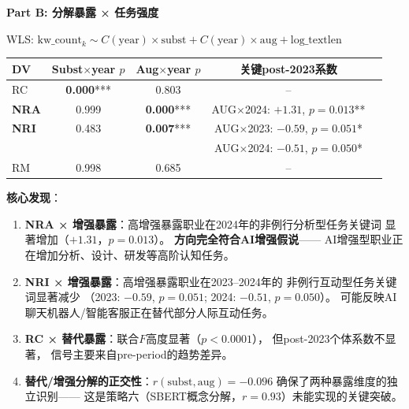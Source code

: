\documentclass[12pt,a4paper]{ctexart}
\begin{document}
\begin{resultbox}

\textbf{Part B: 分解暴露 × 任务强度}

WLS: $\text{kw\_count}_k \sim C(\text{year}) \times \text{subst} + C(\text{year}) \times \text{aug} + \text{log\_textlen}$

\begin{center}
\small
\begin{tabular}{lcccc}
\toprule
DV & Subst$\times$year $p$ & Aug$\times$year $p$ & 关键post-2023系数 \\
\midrule
RC & \textbf{0.000}*** & 0.803 & -- \\
\textbf{NRA} & 0.999 & \textbf{0.000}*** & AUG$\times$2024: $+1.31$, $p=0.013$** \\
\textbf{NRI} & 0.483 & \textbf{0.007}*** & AUG$\times$2023: $-0.59$, $p=0.051$* \\
 & & & AUG$\times$2024: $-0.51$, $p=0.050$* \\
RM & 0.998 & 0.685 & -- \\
\bottomrule
\end{tabular}
\end{center}

\textbf{核心发现}：

\begin{enumerate}
\item \textbf{NRA × 增强暴露}：高增强暴露职业在2024年的非例行分析型任务关键词
      显著增加（$+1.31$，$p=0.013$）。
      \textbf{方向完全符合AI增强假说}——
      AI增强型职业正在增加分析、设计、研发等高阶认知任务。

\item \textbf{NRI × 增强暴露}：高增强暴露职业在2023--2024年的
      非例行互动型任务关键词显著减少
      （2023: $-0.59$, $p=0.051$; 2024: $-0.51$, $p=0.050$）。
      可能反映AI聊天机器人/智能客服正在替代部分人际互动任务。

\item \textbf{RC × 替代暴露}：联合$F$高度显著（$p<0.0001$），
      但post-2023个体系数不显著，
      信号主要来自pre-period的趋势差异。

\item \textbf{替代/增强分解的正交性}：$r(\text{subst}, \text{aug}) = -0.096$
      确保了两种暴露维度的独立识别——
      这是策略六（SBERT概念分解，$r=0.93$）未能实现的关键突破。
\end{enumerate}

\end{resultbox}
\end{document}
